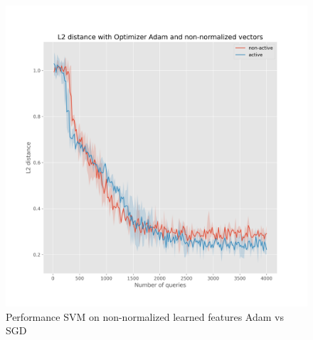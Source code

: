 \documentclass{article}
\begin{document}
\begin{figure}[!h]
\begin{minipage}{.45\textwidth}
    \includegraphics[width=\linewidth]{active-vs-base-moons-l2-loss-Adam-non-normalized-ci}
  \end{minipage}
  \caption{Performance SVM on non-normalized learned features Adam vs SGD}\label{fig:l2-loss-non-normalized-ci}
\end{figure}
\end{document}
